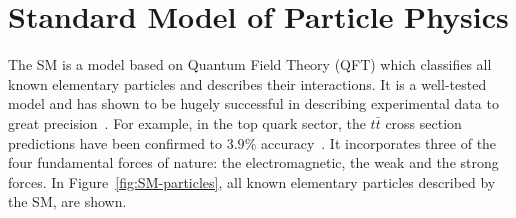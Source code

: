 \section{Standard Model of Particle Physics}
The SM is a model based on Quantum Field Theory (QFT) which classifies all known elementary particles and describes their interactions. It is a well-tested model and has shown to be hugely successful in describing experimental data to great precision~\cite{altarelli2014higgs, ALTARELLI_1998}. For example, in the top quark sector, the $t\bar{t}$ cross section predictions have been confirmed to $3.9\%$ accuracy~\cite{cms-ttbar, ATLAS-CONF-2019-041}. It incorporates three of the four fundamental forces of nature: the electromagnetic, the weak and the strong forces. In Figure~\ref{fig:SM-particles}, all known elementary particles described by the SM, are shown.

